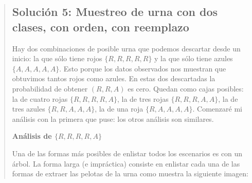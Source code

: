 \documentclass[
]{book}
\begin{document}
\begin{quote}
\hypertarget{soluciuxf3n-5-muestreo-de-urna-con-dos-clases-con-orden-con-reemplazo}{%
\subsection{Solución 5: Muestreo de urna con dos clases, con orden, con reemplazo}\label{soluciuxf3n-5-muestreo-de-urna-con-dos-clases-con-orden-con-reemplazo}}

Hay dos combinaciones de posible urna que podemos descartar desde un inicio: la que sólo tiene rojos \(\{ R, R, R, R, R\}\) y la que sólo tiene azules \(\{ A, A, A, A, A\}\). Esto porque los datos observados nos muestran que obtuvimos tantos rojos como azules. En estas dos descartadas la probabilidad de obtener \(( R, R, A)\) es cero. Quedan como cajas posibles: la de cuatro rojas \(\{ R, R, R, R, A\}\), la de tres rojas \(\{ R, R, R, A, A\}\), la de tres azules \(\{ R, R, A, A, A\}\), la de una roja \(\{ R, A, A, A, A\}\). Comenzaré mi análisis con la primera que puse: los otros análisis son similares.

\textbf{Análisis de \(\{ R, R, R, R, A\}\)}

Una de las formas más posibles de enlistar todos los escenarios es con un árbol. La forma larga (e impráctica) consiste en enlistar cada una de las formas de extraer las pelotas de la urna como muestra la siguiente imagen:


\end{quote}
\end{document}
